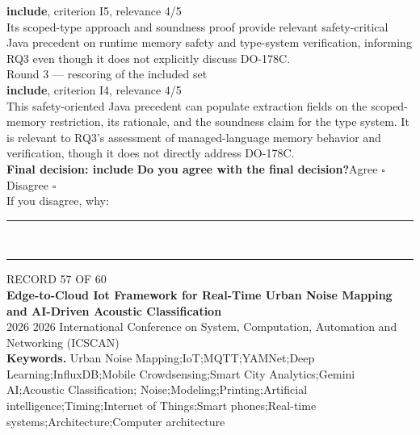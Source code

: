\documentclass[11pt,a4paper]{article}
\begin{document}
{\small\textbf{include}, criterion I5, relevance 4/5}\\[0.5mm]
{\small Its scoped-type approach and soundness proof provide relevant safety-critical Java precedent on runtime memory safety and type-system verification, informing RQ3 even though it does not explicitly discuss DO-178C.}\\[2.5mm]
{\footnotesize\color{soft}Round 3 --- rescoring of the included set}\\[0.5mm]
{\small\textbf{include}, criterion I4, relevance 4/5}\\[0.5mm]
{\small This safety-oriented Java precedent can populate extraction fields on the scoped-memory restriction, its rationale, and the soundness claim for the type system. It is relevant to RQ3's assessment of managed-language memory behavior and verification, though it does not directly address DO-178C.}\\[2.5mm]
{\small\textbf{Final decision: include}}
\vspace{2mm}
{\small\textbf{Do you agree with the final decision?}\quad{}Agree $\square$\qquad{}Disagree $\square$}\\[1mm]
{\footnotesize\color{soft}If you disagree, why:}\\[1mm]
\color{rule}\rule{\linewidth}{0.3pt}\\[3mm]\rule{\linewidth}{0.3pt}\color{black}
\clearpage
{\color{soft}\footnotesize RECORD 57 OF 60}\\[1mm]
{\large\bfseries Edge-to-Cloud Iot Framework for Real-Time Urban Noise Mapping and AI-Driven Acoustic Classification}\\[1.5mm]
{\color{soft}\small 2026 \textperiodcentered{} 2026 International Conference on System, Computation, Automation and Networking (ICSCAN)}\\[2mm]
{\small\textbf{Keywords.} Urban Noise Mapping;IoT;MQTT;YAMNet;Deep Learning;InfluxDB;Mobile Crowdsensing;Smart City Analytics;Gemini AI;Acoustic Classification; Noise;Modeling;Printing;Artificial intelligence;Timing;Internet of Things;Smart phones;Real-time systems;Architecture;Computer architecture}\\[2mm]
\end{document}
